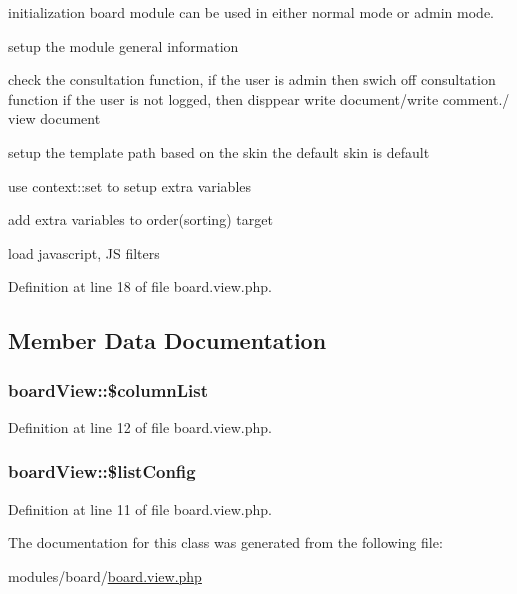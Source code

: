 initialization board module can be used in either normal mode or admin mode.~\newline


setup the module general information

check the consultation function, if the user is admin then swich off consultation function if the user is not logged, then disppear write document/write comment./ view document

setup the template path based on the skin the default skin is default

use context\+::set to setup extra variables

add extra variables to order(sorting) target

load javascript, J\+S filters

Definition at line 18 of file board.\+view.\+php.



\subsection{Member Data Documentation}
\hypertarget{classboardView_a44f0d3c92b73c34329708f5fe44652cc}{}
\subsubsection[{\$column\+List}]{\setlength{\rightskip}{0pt plus 5cm}board\+View\+::\$column\+List}\label{classboardView_a44f0d3c92b73c34329708f5fe44652cc}


Definition at line 12 of file board.\+view.\+php.

\hypertarget{classboardView_a8d64b7032d159a960972ae38f76897f8}{}
\subsubsection[{\$list\+Config}]{\setlength{\rightskip}{0pt plus 5cm}board\+View\+::\$list\+Config}\label{classboardView_a8d64b7032d159a960972ae38f76897f8}


Definition at line 11 of file board.\+view.\+php.



The documentation for this class was generated from the following file\+:\begin{DoxyCompactItemize}
\item 
modules/board/\hyperlink{board_8view_8php}{board.\+view.\+php}\end{DoxyCompactItemize}
